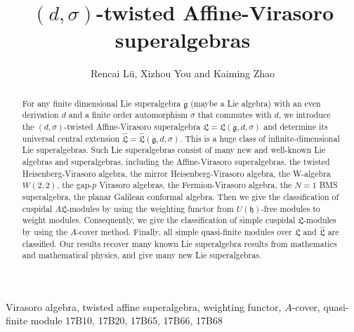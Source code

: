 \documentclass[1p]{elsarticle}
\numberwithin{equation}{section}
\def\dg{\dot{\mathfrak{g}}}
\def\fL{\mathfrak{L}}
\def\hL{\hat{\fL}}
\begin{document}
\begin{frontmatter}



\title{$(d,\sigma)$-twisted Affine-Virasoro superalgebras}


\author{Rencai L\"u, Xizhou You and Kaiming Zhao}



\begin{abstract}
For any finite dimensional Lie superalgebra $\dg$ (maybe a Lie algebra) with an even derivation $d$ and a finite order automorphism $\sigma$ that commutes with $d$, we introduce  the $(d,\sigma)$-twisted Affine-Virasoro superalgebra $\fL=\fL(\dg,d,\sigma)$ and determine its universal central extension $\hL=\hL(\dg,d,\sigma)$. This is a huge class of infinite-dimensional Lie superalgebras. Such Lie superalgebras consist of  many new and  well-known Lie algebras and superalgebras, including the   Affine-Virasoro superalgebras,  the twisted Heisenberg-Virasoro algebra, the mirror Heisenberg-Virasoro algebra, the W-algebra $W(2,2)$,   the gap-$p$ Virasoro algebras, the Fermion-Virasoro algebra, the $N=1$ BMS superalgebra, the  planar Galilean conformal algebra. Then we   give the classification of cuspidal $A\fL$-modules by using the weighting functor from $U(\mathfrak{h})$-free modules to weight modules. Consequently, we give the classification of simple cuspidal $\fL$-modules by using the $A$-cover method. Finally, all simple quasi-finite modules over $\fL$ and $\hL$ are classified.  Our results  recover many known Lie superalgebra results from mathematics and mathematical physics, and give many new Lie superalgebras.
\end{abstract}

\begin{keyword}
Virasoro algebra, twisted affine superalgebra, weighting functor, $A$-cover, quasi-finite module
\MSC[2000] 17B10, 17B20, 17B65, 17B66, 17B68
\end{keyword}

\end{frontmatter}
\end{document}
